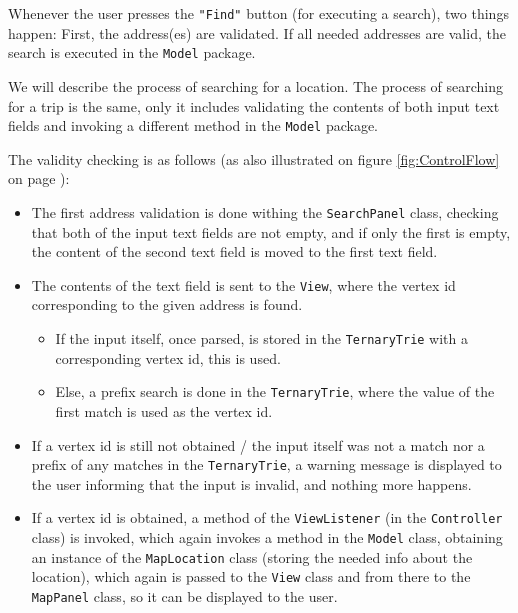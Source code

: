 Whenever the user presses the \texttt{"Find"} button (for executing a search), two things happen: First, the address(es) are validated. If all needed addresses are valid, the search is executed in the \texttt{Model} package.

We will describe the process of searching for a location. The process of searching for a trip is the same, only it includes validating the contents of both input text fields and invoking a different method in the \texttt{Model} package.

The validity checking is as follows (as also illustrated on figure \ref{fig:ControlFlow} on page \pageref{fig:ControlFlow}):
\begin{itemize}
	\item The first address validation is done withing the \texttt{SearchPanel} class, checking that both of the input text fields are not empty, and if only the first is empty, the content of the second text field is moved to the first text field.
	\item The contents of the text field is sent to the \texttt{View}, where the vertex id corresponding to the given address is found.
	\begin{itemize}
		\item If the input itself, once parsed, is stored in the \texttt{TernaryTrie} with a corresponding vertex id, this is used.
		\item Else, a prefix search is done in the \texttt{TernaryTrie}, where the value of the first match is used as the vertex id.
	\end{itemize}
	\item If a vertex id is still not obtained / the input itself was not a match nor a prefix of any matches in the \texttt{TernaryTrie}, a warning message is displayed to the user informing that the input is invalid, and nothing more happens.
	\item If a vertex id is obtained, a method of the \texttt{ViewListener} (in the \texttt{Controller} class) is invoked, which again invokes a method in the \texttt{Model} class, obtaining an instance of the \texttt{MapLocation} class (storing the needed info about the location), which again is passed to the \texttt{View} class and from there to the \texttt{MapPanel} class, so it can be displayed to the user.
\end{itemize}

